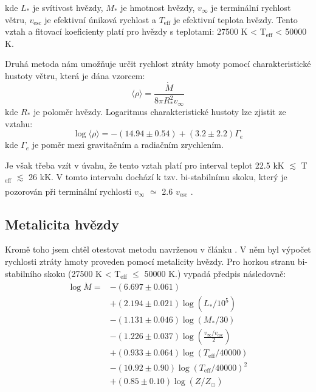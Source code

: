 \documentclass[a4paper,11pt]{article}
\begin{document}
    \begin{minipage}[t]{0.5\textwidth} 
                kde $L_*$ je svítivost hvězdy, $M_*$ je hmotnost hvězdy, $v_{\infty}$ je terminální rychlost větru, $v_{\text{esc}}$ je efektivní úniková rychlost a $T_{\text{eff}}$ je efektivní teplota hvězdy. Tento vztah a fitovací koeficienty platí pro hvězdy s teplotami: 27500 K < T$_{\text{eff}}$ < 50000 K.
                \par Druhá metoda nám umožňuje určit rychlost ztráty hmoty pomocí charakteristické hustoty větru, která je dána vzorcem:
                \begin{equation}
                    \langle \rho \rangle = \frac{\dot{M}}{8 \pi R_*^2 v_{\infty}}
                \end{equation}
                kde $R_*$ je poloměr hvězdy. Logaritmus charakteristické hustoty lze zjistit ze vztahu:
                \begin{equation}
                    \log \langle \rho \rangle = - (14.94 \pm 0.54) + (3.2 \pm 2.2) \Gamma_e
                \end{equation}
                kde $\Gamma_e$ je poměr mezi gravitačním a radiačním zrychlením.
                \par Je však třeba vzít v úvahu, že tento vztah platí pro interval teplot 22.5 kK $\lesssim$  T$_{\text{eff}}$ $\lesssim$ 26 kK. V tomto intervalu dochází k tzv. bi-stabilnímu skoku, který je pozorován při terminální rychlosti $v_{\infty}$ $\simeq$ 2.6 $v_{\text{esc}}$ \textsuperscript{\cite{2000ASPC..204..427V}}.

            \subsection{Metalicita hvězdy}
                Kromě toho jsem chtěl otestovat metodu navrženou v článku \cite{2001A&A...369..574V}. V něm byl výpočet rychlosti ztráty hmoty proveden pomocí metalicity hvězdy. Pro horkou stranu bi-stabilního skoku (27500 K < T$_{\text{eff}}$ $\leq$ 50000 K.) vypadá předpis následovně: 
                \begin{equation}
                    \begin{aligned}
                        \log \dot{M} = & - (6.697 \pm 0.061) \\
                        & + (2.194 \pm 0.021) \log (L_*/10^5) \\
                        & - (1.131 \pm 0.046) \log (M_*/30) \\
                        & - (1.226 \pm 0.037) \log \left(\frac{v_{\infty}/v_{\text{esc}}}{2}\right) \\
                        & + (0.933 \pm 0.064) \log (T_{\text{eff}}/40000) \\
                        & - (10.92 \pm 0.90) \log (T_{\text{eff}}/40000)^2 \\
                        & + (0.85 \pm 0.10) \log (Z/Z_{\odot})
                    \end{aligned}
                \end{equation}
    \end{minipage}
\end{document}
